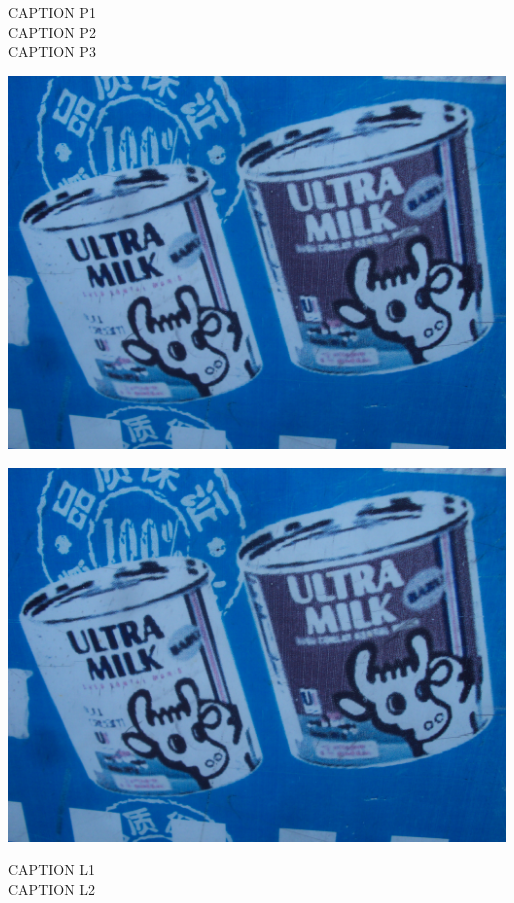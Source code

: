 \documentclass[10pt,letterpaper]{article}
\begin{document}
CAPTION P1\\
CAPTION P2\\
CAPTION P3\\
\pagebreak

\includegraphics[width=5.19in]{landscape.jpg}

\vspace{0.25in}
\includegraphics[width=5.19in]{landscape.jpg}

CAPTION L1\\
CAPTION L2\\
\pagebreak
\end{document}
